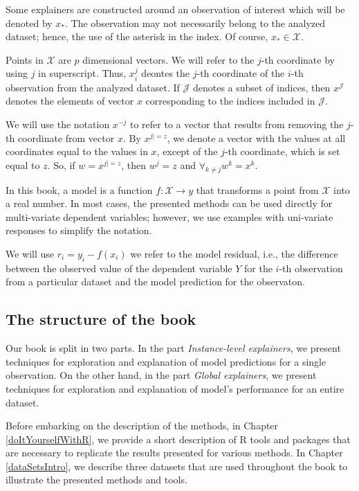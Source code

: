 \documentclass[12pt,]{krantz}
\begin{document}
Some explainers are constructed around an observation of interest which will be denoted by \(x_{*}\). The observation may not necessarily belong to the analyzed dataset; hence, the use of the asterisk in the index. Of course, \(x_* \in \mathcal X\).

Points in \(\mathcal X\) are \(p\) dimensional vectors. We will refer to the \(j\)-th coordinate by using \(j\) in superscript. Thus, \(x^j_i\) deontes the \(j\)-th coordinate of the \(i\)-th observation from the analyzed dataset. If \(\mathcal J\) denotes a subset of indices, then \(x^{\mathcal J}\) denotes the elements of vector \(x\) corresponding to the indices included in \(\mathcal J\).

We will use the notation \(x^{-j}\) to refer to a vector that results from removing the \(j\)-th coordinate from vector \(x\). By \(x^{j|=z}\), we denote a vector with the values at all coordinates equal to the values in \(x\), except of the \(j\)-th coordinate, which is set equal to \(z\). So, if \(w=x^{j|=z}\), then \(w^j = z\) and \(\forall_{k\neq j} w^k = x^k\).

In this book, a model is a function \(f:\mathcal X \rightarrow y\) that transforms a point from \(\mathcal X\) into a real number. In most cases, the presented methods can be used directly for multi-variate dependent variables; however, we use examples with uni-variate responses to simplify the notation.

We will use \(r_i = y_i - f(x_i)\) we refer to the model residual, i.e., the difference between the observed value of the dependent variable \(Y\) for the \(i\)-th observation from a particular dataset and the model prediction for the observaton.

\hypertarget{bookstructure}{%
\subsection{The structure of the book}\label{bookstructure}}

Our book is split in two parts. In the part \emph{Instance-level explainers}, we present techniques for exploration and explanation of model predictions for a single observation. On the other hand, in the part \emph{Global explainers}, we present techniques for exploration and explanation of model's performance for an entire dataset.

Before embarking on the description of the methods, in Chapter \ref{doItYourselfWithR}, we provide a short description of R tools and packages that are necessary to replicate the results presented for various methods. In Chapter \ref{dataSetsIntro}, we describe three datasets that are used throughout the book to illustrate the presented methods and tools.
\end{document}
